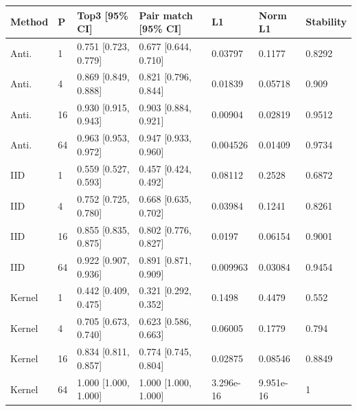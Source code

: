 \begingroup\footnotesize\setlength{\tabcolsep}{3pt}
\begin{tabular}{lllllll}
\toprule
Method & P & Top3 [95\% CI] & Pair match [95\% CI] & L1 & Norm L1 & Stability \\
\midrule
Anti. & 1 & 0.751 [0.723, 0.779] & 0.677 [0.644, 0.710] & 0.03797 & 0.1177 & 0.8292 \\
Anti. & 4 & 0.869 [0.849, 0.888] & 0.821 [0.796, 0.844] & 0.01839 & 0.05718 & 0.909 \\
Anti. & 16 & 0.930 [0.915, 0.943] & 0.903 [0.884, 0.921] & 0.00904 & 0.02819 & 0.9512 \\
Anti. & 64 & 0.963 [0.953, 0.972] & 0.947 [0.933, 0.960] & 0.004526 & 0.01409 & 0.9734 \\
IID & 1 & 0.559 [0.527, 0.593] & 0.457 [0.424, 0.492] & 0.08112 & 0.2528 & 0.6872 \\
IID & 4 & 0.752 [0.725, 0.780] & 0.668 [0.635, 0.702] & 0.03984 & 0.1241 & 0.8261 \\
IID & 16 & 0.855 [0.835, 0.875] & 0.802 [0.776, 0.827] & 0.0197 & 0.06154 & 0.9001 \\
IID & 64 & 0.922 [0.907, 0.936] & 0.891 [0.871, 0.909] & 0.009963 & 0.03084 & 0.9454 \\
Kernel & 1 & 0.442 [0.409, 0.475] & 0.321 [0.292, 0.352] & 0.1498 & 0.4479 & 0.552 \\
Kernel & 4 & 0.705 [0.673, 0.740] & 0.623 [0.586, 0.663] & 0.06005 & 0.1779 & 0.794 \\
Kernel & 16 & 0.834 [0.811, 0.857] & 0.774 [0.745, 0.804] & 0.02875 & 0.08546 & 0.8849 \\
Kernel & 64 & 1.000 [1.000, 1.000] & 1.000 [1.000, 1.000] & 3.296e-16 & 9.951e-16 & 1 \\
\bottomrule
\end{tabular}

\endgroup
